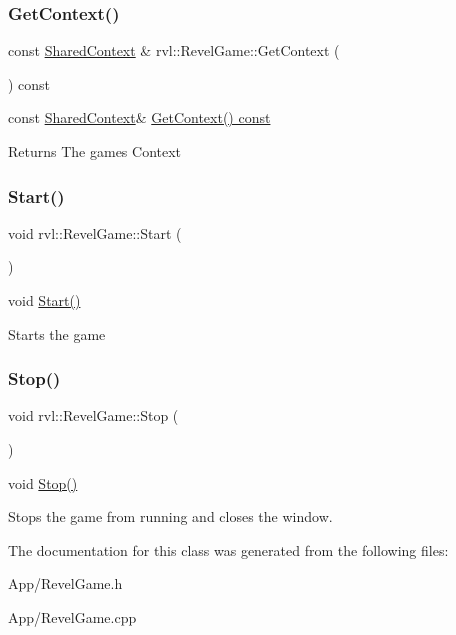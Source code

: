 \subsubsection{\texorpdfstring{Get\+Context()}{GetContext()}}
{\footnotesize\ttfamily const \hyperlink{structrvl_1_1_shared_context}{Shared\+Context} \& rvl\+::\+Revel\+Game\+::\+Get\+Context (\begin{DoxyParamCaption}{ }\end{DoxyParamCaption}) const}



const \hyperlink{structrvl_1_1_shared_context}{Shared\+Context}\& \hyperlink{classrvl_1_1_revel_game_ab5f7b1a12844e3481d66ab00db1f0104}{Get\+Context() const} 

\begin{DoxyReturn}{Returns}
The games Context 
\end{DoxyReturn}
\mbox{\label{classrvl_1_1_revel_game_aaef0b7a8d82a7cc326b39f45c3be0b83}} 
\subsubsection{\texorpdfstring{Start()}{Start()}}
{\footnotesize\ttfamily void rvl\+::\+Revel\+Game\+::\+Start (\begin{DoxyParamCaption}{ }\end{DoxyParamCaption})}



void \hyperlink{classrvl_1_1_revel_game_aaef0b7a8d82a7cc326b39f45c3be0b83}{Start()} 

Starts the game \mbox{\label{classrvl_1_1_revel_game_ae2e535afe54176e266c1ec25ad11f9bc}} 
\subsubsection{\texorpdfstring{Stop()}{Stop()}}
{\footnotesize\ttfamily void rvl\+::\+Revel\+Game\+::\+Stop (\begin{DoxyParamCaption}{ }\end{DoxyParamCaption})}



void \hyperlink{classrvl_1_1_revel_game_ae2e535afe54176e266c1ec25ad11f9bc}{Stop()} 

Stops the game from running and closes the window. 

The documentation for this class was generated from the following files\+:\begin{DoxyCompactItemize}
\item 
App/Revel\+Game.\+h\item 
App/Revel\+Game.\+cpp\end{DoxyCompactItemize}
